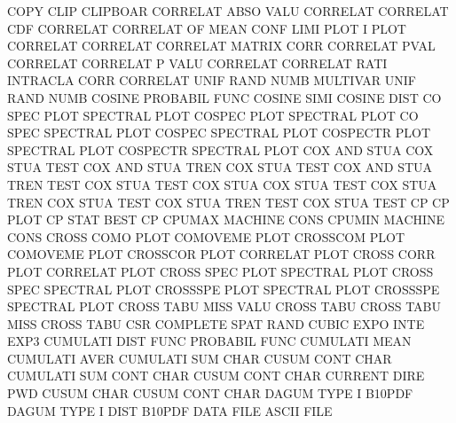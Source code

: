 COPY     CLIP                           CLIPBOAR
CORRELAT ABSO VALU                      CORRELAT
CORRELAT CDF                            CORRELAT
CORRELAT OF   MEAN CONF LIMI PLOT       I        PLOT
CORRELAT                                CORRELAT
CORRELAT                                MATRIX   CORR
CORRELAT PVAL                           CORRELAT
CORRELAT P    VALU                      CORRELAT
CORRELAT RATI                           INTRACLA CORR
CORRELAT UNIF RAND NUMB                 MULTIVAR UNIF RAND NUMB
COSINE                                  PROBABIL FUNC
COSINE   SIMI                           COSINE   DIST
CO       SPEC PLOT                      SPECTRAL PLOT
COSPEC   PLOT                           SPECTRAL PLOT
CO       SPEC                           SPECTRAL PLOT
COSPEC                                  SPECTRAL PLOT
COSPECTR PLOT                           SPECTRAL PLOT
COSPECTR                                SPECTRAL PLOT
COX      AND  STUA                      COX      STUA TEST
COX      AND  STUA TREN                 COX      STUA TEST
COX      AND  STUA TREN TEST            COX      STUA TEST
COX      STUA                           COX      STUA TEST
COX      STUA TREN                      COX      STUA TEST
COX      STUA TREN TEST                 COX      STUA TEST
CP                                      CP       PLOT
CP       STAT                           BEST     CP
CPUMAX                                  MACHINE  CONS
CPUMIN                                  MACHINE  CONS
CROSS    COMO PLOT                      COMOVEME PLOT
CROSSCOM PLOT                           COMOVEME PLOT
CROSSCOR PLOT                           CORRELAT PLOT
CROSS    CORR PLOT                      CORRELAT PLOT
CROSS    SPEC PLOT                      SPECTRAL PLOT
CROSS    SPEC                           SPECTRAL PLOT
CROSSSPE PLOT                           SPECTRAL PLOT
CROSSSPE                                SPECTRAL PLOT
CROSS    TABU MISS VALU                 CROSS    TABU
CROSS    TABU MISS                      CROSS    TABU
CSR                                     COMPLETE SPAT RAND
CUBIC    EXPO INTE                      EXP3
CUMULATI DIST FUNC                      PROBABIL FUNC
CUMULATI MEAN                           CUMULATI AVER
CUMULATI SUM  CHAR                      CUSUM    CONT CHAR
CUMULATI SUM  CONT CHAR                 CUSUM    CONT CHAR
CURRENT  DIRE                           PWD
CUSUM    CHAR                           CUSUM    CONT CHAR
DAGUM    TYPE I                         B10PDF
DAGUM    TYPE I    DIST                 B10PDF
DATA     FILE                           ASCII    FILE
